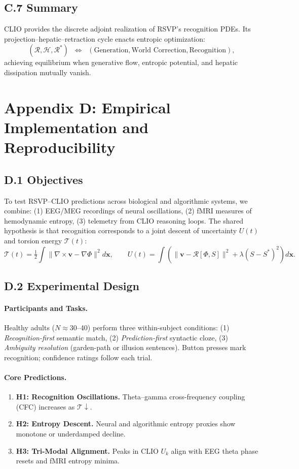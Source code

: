 \documentclass[11pt]{article}
\begin{document}
\subsection*{C.7 Summary}
CLIO provides the discrete adjoint realization of RSVP’s recognition PDEs.
Its projection–hepatic–retraction cycle enacts entropic optimization:
\[
(\mathcal{R},\mathcal{H},\mathcal{R}^\ast)
\;\;\Longleftrightarrow\;\;
(\text{Generation},\text{World Correction},\text{Recognition}),
\]
achieving equilibrium when generative flow, entropic potential,
and hepatic dissipation mutually vanish.

\section*{Appendix D: Empirical Implementation and Reproducibility}

\subsection*{D.1 Objectives}
To test RSVP–CLIO predictions across biological and algorithmic systems, we
combine:
(1) EEG/MEG recordings of neural oscillations,
(2) fMRI measures of hemodynamic entropy,
(3) telemetry from CLIO reasoning loops.
The shared hypothesis is that recognition corresponds to a joint descent of
uncertainty $U(t)$ and torsion energy $\mathcal{T}(t)$:
\[
\mathcal{T}(t)
  = \tfrac12\!\int\!\|\nabla\times\mathbf{v}-\nabla\Phi\|^2 d\mathbf{x},
\qquad
U(t)
  = \!\int\!(\|\mathbf{v}-\mathcal{R}[\Phi,S]\|^2
           +\lambda(S-S^\ast)^2)d\mathbf{x}.
\]

\subsection*{D.2 Experimental Design}
\paragraph{Participants and Tasks.}
Healthy adults ($N\!\approx\!30$–40) perform three within-subject conditions:
(1) \emph{Recognition-first} semantic match,
(2) \emph{Prediction-first} syntactic cloze,
(3) \emph{Ambiguity resolution} (garden-path or illusion sentences).
Button presses mark recognition; confidence ratings follow each trial.

\paragraph{Core Predictions.}
\begin{enumerate}
\item \textbf{H1: Recognition Oscillations.}  
   Theta–gamma cross-frequency coupling (CFC) increases as $\mathcal{T}\!\downarrow$.
\item \textbf{H2: Entropy Descent.}  
   Neural and algorithmic entropy proxies show monotone or underdamped decline.
\item \textbf{H3: Tri-Modal Alignment.}  
   Peaks in CLIO $U_k$ align with EEG theta phase resets and fMRI entropy minima.
\end{enumerate}
\end{document}
